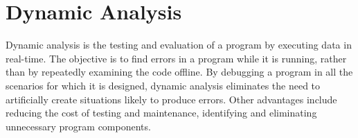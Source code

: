 





\clearpage
\section{Dynamic Analysis}
Dynamic analysis is the testing and evaluation of a program by executing data in real-time. The objective is to find errors in a program while it is running, rather than by repeatedly examining the code offline.
By debugging a program in all the scenarios for which it is designed, dynamic analysis eliminates the need to artificially create situations likely to produce errors. Other advantages include reducing the cost of testing and maintenance, identifying and eliminating unnecessary program components.

